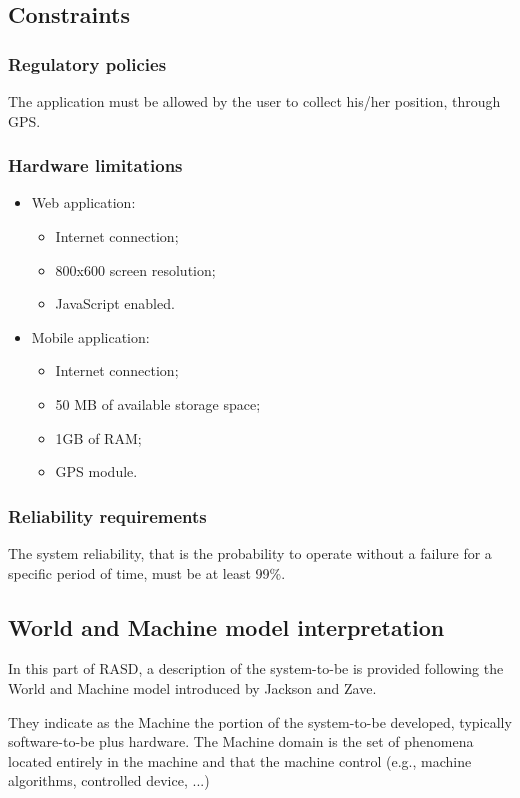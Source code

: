 \documentclass{article}
\begin{document}
	
	\subsection{Constraints}
	
	
	\subsubsection{Regulatory policies}
	The application must be allowed by the user to collect his/her position, through GPS.
	
	
	\subsubsection{Hardware limitations}\label{ref1}
	\begin{itemize}
		\item Web application:
			\begin{itemize}
				\item Internet connection;
				\item 800x600 screen resolution;
				\item JavaScript enabled.
			\end{itemize}
		\item Mobile application:
			\begin{itemize}
				\item Internet connection;
				\item 50 MB of available storage space;
				\item 1GB of RAM;
				\item GPS module.
			\end{itemize}
	\end{itemize}
	
	
	\subsubsection{Reliability requirements}
	The system reliability, that is the probability to operate without a failure for a specific period of time, must be at least 99\%.
	
	
	\subsection{World and Machine model interpretation}
	In this part of RASD, a description of the system-to-be is provided following the World and Machine model introduced by Jackson and Zave.
	
	\bigskip
	They indicate as the Machine the portion of the system-to-be developed, typically software-to-be plus hardware. The Machine domain is the set of phenomena located entirely in the machine and that the machine control (e.g., machine algorithms, controlled device, ...)
	
\end{document}
